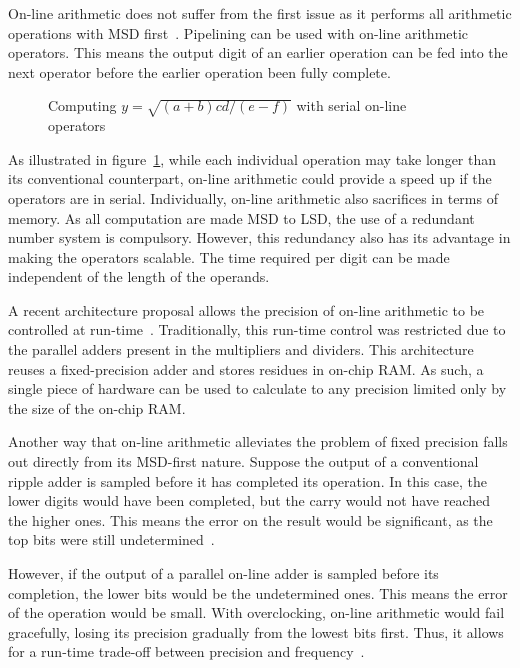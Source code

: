 On-line arithmetic does not suffer from the first issue as it performs all
arithmetic operations with MSD first~\cite{Ercegovac1}.
Pipelining can be used with on-line arithmetic operators.
This means the output digit of an earlier operation can be fed into the next
operator before the earlier operation been fully complete.

\begin{figure}[H]
  \centering
  
  \caption{Computing $y=\sqrt{(a+b)cd/(e-f)}$ with serial on-line
           operators~\cite{Ercegovac1}}
  \label{Online}
\end{figure}

As illustrated in figure~\ref{Online}, while each individual operation may
take longer than its conventional counterpart, on-line arithmetic could provide
a speed up if the operators are in serial.
Individually, on-line arithmetic also sacrifices in terms of memory.
As all computation are made MSD to LSD, the use of a redundant number system
is compulsory.
However, this redundancy also has its advantage in making the operators
scalable.
The time required per digit can be made independent of the length of the
operands.~\cite{Trivedi1}

A recent architecture proposal allows the precision of
on-line arithmetic to be controlled at run-time~\cite{Zhao1}.
Traditionally, this run-time control was restricted due to the parallel adders
present in the multipliers and dividers.
This architecture reuses a fixed-precision adder and stores residues in
on-chip RAM.
As such, a single piece of hardware can be used to calculate to any precision
limited only by the size of the on-chip RAM.

Another way that on-line arithmetic alleviates the problem of fixed precision
falls out directly from its MSD-first nature.
Suppose the output of a conventional ripple adder is sampled before
it has completed its operation.
In this case, the lower digits would have been completed, but the carry would
not have reached the higher ones.
This means the error on the result would be significant, as the top bits
were still undetermined~\cite{Shi1}.

However, if the output of a parallel on-line adder is sampled before its
completion, the lower bits would be the undetermined ones.
This means the error of the operation would be small.
With overclocking, on-line arithmetic would fail gracefully, losing its
precision gradually from the lowest bits first.
Thus, it allows for a run-time trade-off between precision and
frequency~\cite{Shi2}.

